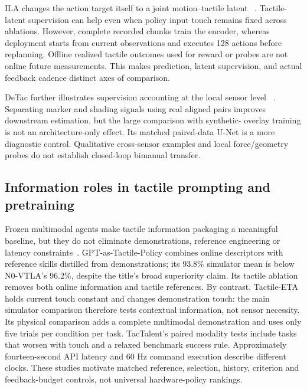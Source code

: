 ILA changes the action target itself to a joint motion--tactile latent
~\cite{zheng2026ila}. Tactile-latent supervision can help even when policy input
touch remains fixed across ablations. However, complete recorded chunks train
the encoder, whereas deployment starts from current observations and executes
128 actions before replanning. Offline realized tactile outcomes used for reward
or probes are not online future measurements. This makes prediction, latent
supervision, and actual feedback cadence distinct axes of comparison.

DeTac further illustrates supervision accounting at the local sensor level
~\cite{zhang2026detac}. Separating marker and shading signals using real aligned
pairs improves downstream estimation, but the large comparison with synthetic-
overlay training is not an architecture-only effect. Its matched paired-data
U-Net is a more diagnostic control. Qualitative cross-sensor examples and local
force/geometry probes do not establish closed-loop bimanual transfer.

\subsection{Information roles in tactile prompting and pretraining}

Frozen multimodal agents make tactile information packaging a meaningful
baseline, but they do not eliminate demonstrations, reference engineering or
latency constraints~\cite{update2026gptastactilepolicy,update2026tactileeta,
update2026tactalent}. GPT-as-Tactile-Policy combines online descriptors with
reference skills distilled from demonstrations; its 93.8\% simulator mean is
below N0-VTLA's 96.2\%, despite the title's broad superiority claim. Its tactile
ablation removes both online information and tactile references. By contrast,
Tactile-ETA holds current touch constant and changes demonstration touch:
the main simulator comparison therefore tests contextual information, not sensor
necessity. Its physical comparison adds a complete multimodal demonstration and
uses only five trials per condition per task. TacTalent's paired modality tests
include tasks that worsen with touch and a relaxed benchmark success rule.
Approximately fourteen-second API latency and 60 Hz command execution describe
different clocks. These studies motivate matched reference, selection, history,
criterion and feedback-budget controls, not universal hardware-policy rankings.

